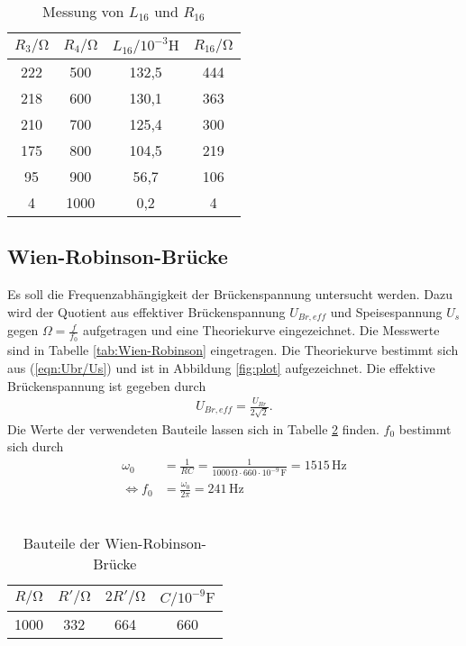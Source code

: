 \begin{table}
  \centering
  \caption{Messung von $L_{16}$ und $R_{16}$}
  \label{tab:Cx,Rx,Maxwell}
  \begin{tabular}{c c c c}
    \toprule
    $R_3/\unit{\ohm}$ & $R_4/\unit{\ohm}$ & $L_{16}/10^{-3}\unit{\henry}$ & $R_{16}/\unit{\ohm}$ \\
    \midrule
    222 &  500 &  132,5 & 444 \\
    218 &  600 &  130,1 & 363 \\
    210 &  700 &  125,4 & 300 \\
    175 &  800 &  104,5 & 219 \\
     95 &  900 &   56,7 & 106 \\
      4 & 1000 &    0,2 &   4 \\
    \bottomrule
  \end{tabular}
\end{table}

\subsection{Wien-Robinson-Brücke}
Es soll die Frequenzabhängigkeit der Brückenspannung untersucht werden. Dazu wird der Quotient aus effektiver Brückenspannung $U_{Br,eff}$ und Speisespannung $U_s$
gegen $\Omega = \frac{f}{f_0}$ aufgetragen und eine Theoriekurve eingezeichnet. Die Messwerte sind in Tabelle \ref{tab:Wien-Robinson} eingetragen.
Die Theoriekurve bestimmt sich aus (\ref{eqn:Ubr/Us}) und ist in Abbildung \ref{fig:plot} aufgezeichnet. Die effektive Brückenspannung ist gegeben durch
\begin{align*}
  U_{Br,eff} = \frac{U_{Br}}{2\sqrt{2}}.
\end{align*}
Die Werte der verwendeten Bauteile lassen sich in Tabelle \ref{tab:Bauteile} finden. $f_0$ bestimmt sich durch
\begin{align*}
  \omega_0 &= \frac{1}{RC} = \frac{1}{1000\,\unit{\ohm}\cdot 660 \cdot 10^{-9} \,\unit{\farad}} = 1515\,\unit{\hertz} \\
  \iff f_0 &= \frac{\omega_0}{2\pi} = 241\,\unit{\hertz}
\end{align*}
\\
\begin{table}
  \centering
  \caption{Bauteile der Wien-Robinson-Brücke}
  \label{tab:Bauteile}
  \begin{tabular}{c c c c}
    \toprule
    $R/\unit{\ohm}$ & $R'/\unit{\ohm}$ & $2R'/\unit{\ohm}$ & $C/10^{-9}\unit{\farad}$ \\
    \midrule
    1000 & 332 & 664 & 660 \\
    \bottomrule
  \end{tabular}
\end{table}

